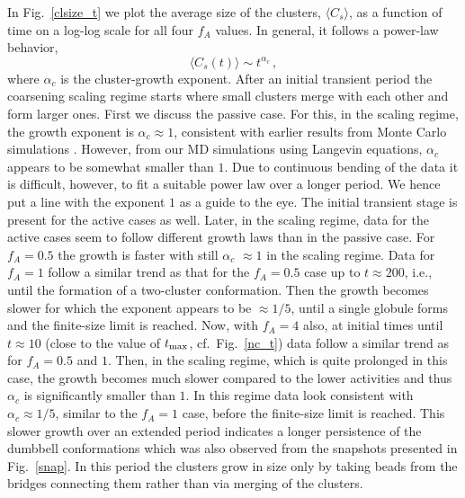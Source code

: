 \documentclass[aps,prx,reprint,showpacs,showkeys,noeprint,longbibliography]{revtex4-1} %
\begin{document}
\par 
In Fig.~\ref{clsize_t} we plot the average size of the clusters, $\langle C_s \rangle$,
as a function of time on a log-log scale for all four $f_A$ values. 
In general, it follows a power-law behavior,
\begin{equation}
\langle C_s(t) \rangle \sim t^{\alpha_c}\,,
\end{equation}
where $\alpha_c$ is the cluster-growth exponent. After an initial transient period the coarsening scaling regime starts where
small clusters merge with each other  and form larger ones. First we discuss the passive case. 
For this, in the scaling regime, the growth exponent is $\alpha_c \approx 1$, consistent with earlier results from Monte Carlo simulations \cite{majumder1, majumder3}. However, from our MD 
simulations using Langevin equations, $\alpha_c$ appears to be somewhat smaller than $1$. Due to continuous bending of the data it is difficult, however, to 
fit a suitable power law over a longer period.  We hence put  a line with the exponent $1$ as a guide to the eye.  The initial transient stage is present for the active cases as well.  Later, in the scaling regime, data for the active cases seem to follow different growth laws than in the passive case. For $f_A=0.5$ the growth is faster with still $\alpha_c$ $\approx 1$ in the scaling regime.
Data for $f_A=1$ follow a similar trend as that for the $f_A=0.5$ case up to $t \approx 200$, i.e., until the formation of a two-cluster conformation. Then the growth becomes slower for which the exponent appears to be $\approx 1/5$, until a single globule forms and the finite-size limit is reached.  Now, with $f_A=4$ also, at initial times until $t \approx 10$ (close to the value of $t_{\rm{max}}$, cf.\ Fig.~\ref{nc_t}) data follow a similar trend as for $f_A=0.5$ and $1$. Then, in the scaling regime, which is quite prolonged in this case, the growth becomes much slower compared to the lower activities and thus  $\alpha_c$ is significantly smaller than $1$. %
In this regime data look consistent with $\alpha_c \approx 1/5$, similar to the $f_A=1$ case, before the finite-size limit is reached.
This slower growth over an extended period indicates a longer persistence of the dumbbell conformations which was also observed from the snapshots presented in Fig.~\ref{snap}. In this period the clusters grow in size only by taking beads from the bridges connecting them rather than via merging of the clusters. 
\end{document}
